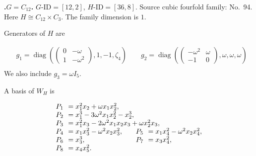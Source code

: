 \documentclass[12pt]{amsart}
\makeatletter
\numberwithin{equation}{section}
\theoremstyle{plain}
\theoremstyle{definition}
\theoremstyle{remark}
\DeclareMathOperator{\diag}{diag}
\newcommand{\PBasisLabel}[1]{\mathrlap{P_{#1}}\phantom{P_{99}}}
\newenvironment{SecEightAlignedBasis}[1]{%
  \begingroup\renewcommand{\arraystretch}{1.18}%
  \[\begin{array}{@{}#1@{}}%
}{\end{array}\]\endgroup}
\newenvironment{familydisplay}{%
  \begingroup
  \setlength{\arraycolsep}{1.35pt}%
  \renewcommand{\arraystretch}{0.96}%
  \setlength{\jot}{2pt}%
}{\endgroup}
\newcommand{\smat}[1]{\left(\begin{smallmatrix}#1\end{smallmatrix}\right)}
\makeatother
\begin{document}
\par{}\medskip\noindent\textbf{.\enspace $G=C_{12}$.}\label{fam:threefold-no-22}
$G\text{-ID}=[12,2]$, $H\text{-ID}=[36,8]$.
Source cubic fourfold family: No.~94.  Here
$H\cong C_{12}\times C_3$.
The family dimension is $1$.
\par\smallskip\noindent Generators of $H$ are\par\nopagebreak
\begin{familydisplay}
\begin{align*}
&g_{1}=\diag\!\left(\smat{0&-\omega\\1&-\omega^2},1,-1,\zeta_4\right)
\qquad g_{2}=\diag\!\left(\smat{-\omega^2&\omega\\-1&0},\omega,\omega,\omega\right)\\
\end{align*}
\end{familydisplay}
\noindent We also include $g_{3}=\omega I_5$.
\par\smallskip\noindent A basis of $W_H$ is\par\nopagebreak
\begin{familydisplay}
\begin{SecEightAlignedBasis}{l@{\qquad}l}
\multicolumn{2}{@{}l@{}}{\PBasisLabel{1}=x_{1}^{2}x_{2}+\omega x_{1}x_{2}^{2},}\\
\multicolumn{2}{@{}l@{}}{\PBasisLabel{2}=x_{1}^{3}-3\omega^{2}x_{1}x_{2}^{2}-x_{2}^{3},}\\
\multicolumn{2}{@{}l@{}}{\PBasisLabel{3}=x_{1}^{2}x_{3}-2\omega^{2}x_{1}x_{2}x_{3}+\omega x_{2}^{2}x_{3},}\\
\PBasisLabel{4}=x_{1}x_{3}^{2}-\omega^{2}x_{2}x_{3}^{2}, & \PBasisLabel{5}=x_{1}x_{4}^{2}-\omega^{2}x_{2}x_{4}^{2},\\
\PBasisLabel{6}=x_{3}^{3}, & \PBasisLabel{7}=x_{3}x_{4}^{2},\\
\multicolumn{2}{@{}l@{}}{\PBasisLabel{8}=x_{4}x_{5}^{2}.}
\end{SecEightAlignedBasis}
\end{familydisplay}
\end{document}
